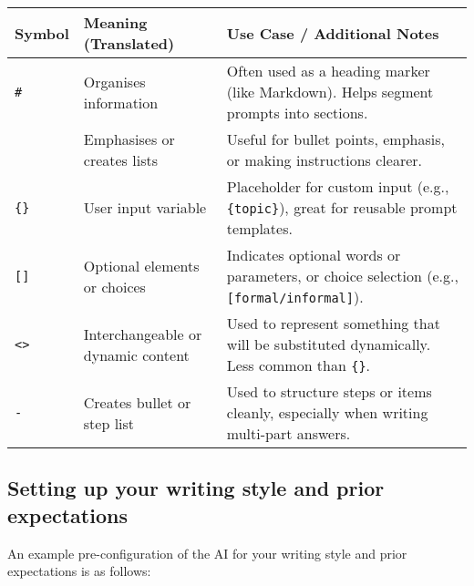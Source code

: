 \documentclass[
  10t,
]{article}
\let\oldtexttt\texttt
\renewcommand{\texttt}[1]{\oldtexttt{\small #1}}
\begin{document}
\begin{longtable}[]{@{}
  >{\raggedright\arraybackslash}p{}
  >{\raggedright\arraybackslash}p{}
  >{\raggedright\arraybackslash}p{}@{}}
\toprule\noalign{}
\begin{minipage}[b]{\linewidth}\raggedright
Symbol
\end{minipage} & \begin{minipage}[b]{\linewidth}\raggedright
Meaning (Translated)
\end{minipage} & \begin{minipage}[b]{\linewidth}\raggedright
Use Case / Additional Notes
\end{minipage} \\
\midrule\noalign{}
\endhead
\bottomrule\noalign{}
\endlastfoot
\texttt{\#} & Organises information & Often used as a heading marker
(like Markdown). Helps segment prompts into sections. \\
\texttt{*} & Emphasises or creates lists & Useful for bullet points,
emphasis, or making instructions clearer. \\
\texttt{\{\}} & User input variable & Placeholder for custom input
(e.g., \texttt{\{topic\}}), great for reusable prompt templates. \\
\texttt{{[}{]}} & Optional elements or choices & Indicates optional
words or parameters, or choice selection (e.g.,
\texttt{{[}formal/informal{]}}). \\
\texttt{\textless{}\textgreater{}} & Interchangeable or dynamic content
& Used to represent something that will be substituted dynamically. Less
common than \texttt{\{\}}. \\
\texttt{-} & Creates bullet or step list & Used to structure steps or
items cleanly, especially when writing multi-part answers. \\
\end{longtable}

\subsection{Setting up your writing style and prior
expectations}\label{setting-up-your-writing-style-and-prior-expectations}

An example pre-configuration of the AI for your writing style and prior
expectations is as follows:
\end{document}
